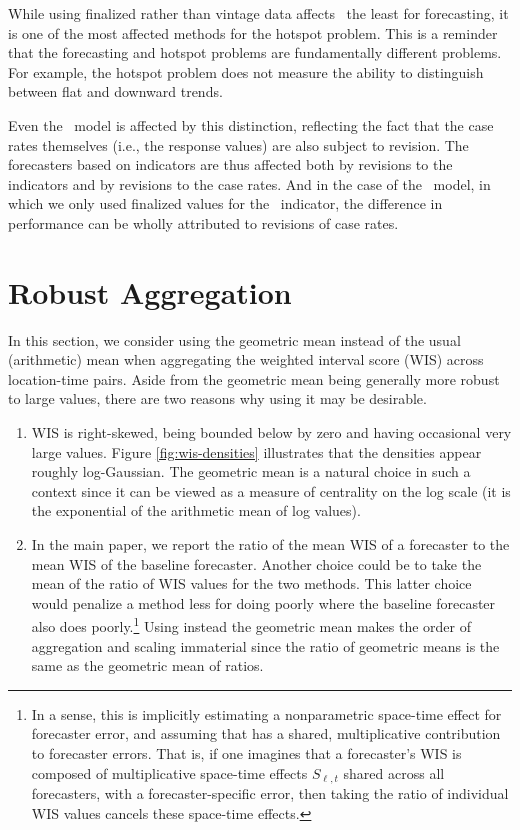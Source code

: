 While using finalized rather than vintage data affects \dv~the least for
forecasting, it is one of the most affected methods for the hotspot problem.
This is a reminder that the forecasting and hotspot problems are fundamentally
different problems.  For example, the hotspot problem does not measure the
ability to distinguish between flat and downward trends.

Even the \ar~model is affected by this distinction, reflecting the fact that the
case rates themselves (i.e., the response values) are also subject to revision.
The forecasters based on indicators are thus affected both by revisions to the
indicators and by revisions to the case rates.  And in the case of the
\gs~model, in which we only used finalized values for the \gs~indicator, the
difference in performance can be wholly attributed to revisions of case rates. 

\section{Robust Aggregation}

In this section, we consider using the geometric mean instead of the usual
(arithmetic) mean when aggregating the weighted interval score (WIS) across
location-time pairs.  Aside from the geometric mean being generally more robust
to large values, there are two reasons why using it may be desirable.  

\begin{enumerate}
\item WIS is right-skewed, being bounded below by zero and having occasional 
  very large values.  Figure \ref{fig:wis-densities} illustrates that the
  densities appear roughly log-Gaussian.  The geometric mean is a natural choice   
  in such a context since it can be viewed as a measure of centrality on the log
  scale (it is the exponential of the arithmetic mean of log values).
\item In the main paper, we report the ratio of the mean WIS of a forecaster to
  the mean WIS of the baseline forecaster. Another choice could be to take the
  mean of the ratio of WIS values for the two methods. This latter choice would
  penalize a method less for doing poorly where the baseline forecaster also
  does poorly.\footnote{In a sense, this is implicitly estimating a
    nonparametric space-time effect for forecaster error, and assuming that has
    a shared, multiplicative contribution to forecaster errors.  That is, if one
    imagines that a forecaster's WIS is composed of multiplicative space-time
    effects $S_{\ell,t}$ shared across all forecasters,
     with
     a forecaster-specific error, then taking the ratio of
    individual WIS values cancels these space-time effects.}  Using instead the
  geometric mean makes the order of aggregation and scaling immaterial since the
  ratio of geometric means is the same as the geometric mean of ratios.
\end{enumerate}

